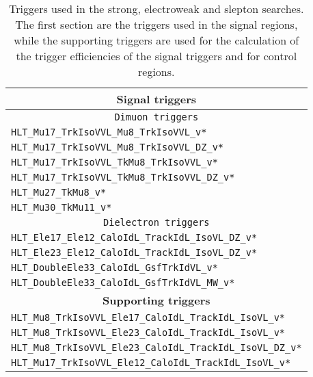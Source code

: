 \begin{table}[ht!]
\def\arraystretch{1.2}
    \caption{Triggers used in the strong, electroweak and slepton searches. The first section are the triggers used in the signal regions, while the supporting triggers are used for the calculation of the trigger efficiencies of the signal triggers and for control regions.}
    \label{tab:triggers}
    \begin{center}
        \begin{tabular}{ l}
        \hline \hline
        \multicolumn{1}{c}{\textbf{Signal triggers} }             \\
        \hline 
        \multicolumn{1}{c}{\texttt{Dimuon triggers} }             \\
        \hline 
        \texttt{HLT\_Mu17\_TrkIsoVVL\_Mu8\_TrkIsoVVL\_v*}         \\
        \texttt{HLT\_Mu17\_TrkIsoVVL\_Mu8\_TrkIsoVVL\_DZ\_v*}      \\
        \texttt{HLT\_Mu17\_TrkIsoVVL\_TkMu8\_TrkIsoVVL\_v*}       \\
        \texttt{HLT\_Mu17\_TrkIsoVVL\_TkMu8\_TrkIsoVVL\_DZ\_v*}     \\
        \texttt{HLT\_Mu27\_TkMu8\_v*}                                \\ 
        \texttt{HLT\_Mu30\_TkMu11\_v*}                               \\
        \hline 
        \multicolumn{1}{c}{\texttt{Dielectron triggers} }             \\
        \hline 
        \texttt{HLT\_Ele17\_Ele12\_CaloIdL\_TrackIdL\_IsoVL\_DZ\_v*}   \\ 
        \texttt{HLT\_Ele23\_Ele12\_CaloIdL\_TrackIdL\_IsoVL\_DZ\_v*}    \\
        \texttt{HLT\_DoubleEle33\_CaloIdL\_GsfTrkIdVL\_v*}               \\
        \texttt{HLT\_DoubleEle33\_CaloIdL\_GsfTrkIdVL\_MW\_v*}               \\
        \hline 
        \multicolumn{1}{c}{\textbf{Supporting triggers}} \\
        \hline 
        \texttt{HLT\_Mu8\_TrkIsoVVL\_Ele17\_CaloIdL\_TrackIdL\_IsoVL\_v*} \\
        \texttt{HLT\_Mu8\_TrkIsoVVL\_Ele23\_CaloIdL\_TrackIdL\_IsoVL\_v*}    \\
        \texttt{HLT\_Mu8\_TrkIsoVVL\_Ele23\_CaloIdL\_TrackIdL\_IsoVL\_DZ\_v*}    \\
        \texttt{HLT\_Mu17\_TrkIsoVVL\_Ele12\_CaloIdL\_TrackIdL\_IsoVL\_v*}    \\

\end{tabular}
\end{center}
\end{table}
